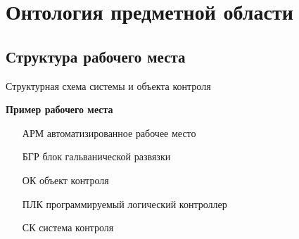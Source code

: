 \section[Теория]{Онтология предметной области}
\subsection{Структура рабочего места}

\begin{frame}{Структурная схема системы и объекта контроля}
    \begin{minipage}[t]{0.57\linewidth}
        \textbf{Пример рабочего места}
    \end{minipage}
    \hfill
    \begin{minipage}[t]{0.4\linewidth}
        \begin{itemize}
            \item[АРМ] автоматизированное рабочее место
            \item[БГР] блок гальванической развязки
            \item[ОК]  объект контроля
            \item[ПЛК] программируемый логический контроллер
            \item[СК]  система контроля            
        \end{itemize}
    \end{minipage}\pause
    \vspace{5mm}
\end{frame}

